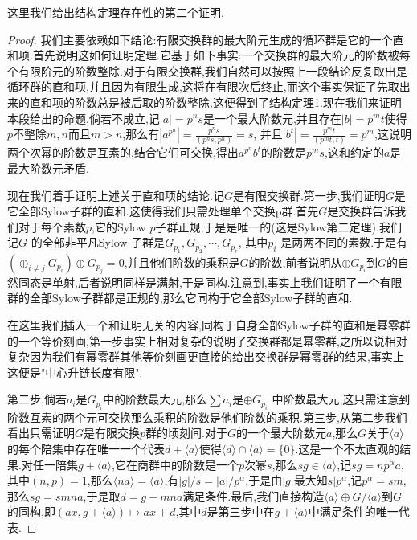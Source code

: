 这里我们给出结构定理存在性的第二个证明.
\begin{proof}
	
	我们主要依赖如下结论:有限交换群的最大阶元生成的循环群是它的一个直和项.首先说明这如何证明定理.它基于如下事实:一个交换群的最大阶元的阶数被每个有限阶元的阶数整除.对于有限交换群,我们自然可以按照上一段结论反复取出是循环群的直和项,并且因为有限生成,这将在有限次后终止,而这个事实保证了先取出来的直和项的阶数总是被后取的阶数整除,这便得到了结构定理1.现在我们来证明本段给出的命题,倘若不成立,记$|a|=p^ns$是一个最大阶数元,并且存在$|b|=p^mt$使得$p$不整除$m,n$而且$m>n$,那么有$|a^{p^n}|=\frac{p^ns}{(p^ns,p^n)}=s$, 并且$|b^t|=\frac{p^mt} {(p^mt,t)}=p^m$,这说明两个次幂的阶数是互素的,结合它们可交换,得出$a^ {p^n}b^t$的阶数是$p^ms$,这和约定的$a$是最大阶数元矛盾.
	
	现在我们着手证明上述关于直和项的结论.记$G$是有限交换群.第一步,我们证明$G$是它全部Sylow子群的直和.这使得我们只需处理单个交换p群.首先$G$是交换群告诉我们对于每个素数$p$,它的Sylow $p$子群正规,于是是唯一的(这是Sylow第二定理).我们记$G$ 的全部非平凡Sylow 子群是$G_{p_1},G_{p_2},\cdots,G_{p_r}$, 其中$p_i$ 是两两不同的素数.于是有$\left(\oplus_{i\not=j}G_{p_i}\right)\oplus G_{p_j}=0$,并且他们阶数的乘积是$G$的阶数,前者说明从$\oplus G_{p_i}$到$G$的自然同态是单射,后者说明同样是满射,于是同构.注意到,事实上我们证明了一个有限群的全部Sylow子群都是正规的,那么它同构于它全部Sylow子群的直和.
	
	在这里我们插入一个和证明无关的内容,同构于自身全部Sylow子群的直和是幂零群的一个等价刻画,第一步事实上相对复杂的说明了交换群都是幂零群,之所以说相对复杂因为我们有幂零群其他等价刻画更直接的给出交换群是幂零群的结果,事实上这便是"中心升链长度有限".
	
	第二步,倘若$a_i$是$G_{p_i}$中的阶数最大元,那么$\sum a_i$是$\oplus G_{p_i}$ 中阶数最大元,这只需注意到阶数互素的两个元可交换那么乘积的阶数是他们阶数的乘积.第三步,从第二步我们看出只需证明$G$是有限交换$p$群的顷刻间.对于$G$的一个最大阶数元$a$,那么$G$关于$\langle a\rangle$的每个陪集中存在唯一一个代表$d+\langle a\rangle$使得$\langle d\rangle\cap\langle a\rangle=\{0\}$.这是一个不太直观的结果.对任一陪集$g+\langle a\rangle$,它在商群中的阶数是一个$p$次幂$s$,那么$sg\in \langle a\rangle$,记$sg=np^{\alpha}a$,其中$(n,p)=1$,那么$\langle na\rangle=\langle a\rangle$,有$|g|/s=|a|/p^{\alpha}$,于是由$|g|$最大知$s|p^{\alpha}$,记$p^{\alpha}=sm$,那么$sg=smna$,于是取$d=g-mna$满足条件.最后,我们直接构造$\langle a\rangle\oplus G/\langle a\rangle$到$G$的同构,即$(ax,g+\langle a\rangle)\mapsto ax+d$,其中$d$是第三步中在$g+\langle a\rangle$中满足条件的唯一代表.
\end{proof}

